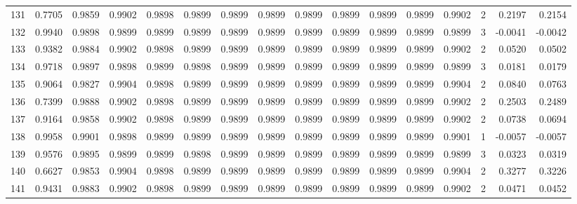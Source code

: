 \begin{tabular}{lrrrrrrrrrrrrrrr}
131 &      0.7705 &  0.9859 &  0.9902 &  0.9898 &  0.9899 &  0.9899 &  0.9899 &  0.9899 &  0.9899 &  0.9899 &   0.9899 &     0.9902 &      2 &                    0.2197 &                     0.2154 \\
132 &      0.9940 &  0.9898 &  0.9899 &  0.9899 &  0.9899 &  0.9899 &  0.9899 &  0.9899 &  0.9899 &  0.9899 &   0.9899 &     0.9899 &      3 &                   -0.0041 &                    -0.0042 \\
133 &      0.9382 &  0.9884 &  0.9902 &  0.9898 &  0.9899 &  0.9899 &  0.9899 &  0.9899 &  0.9899 &  0.9899 &   0.9899 &     0.9902 &      2 &                    0.0520 &                     0.0502 \\
134 &      0.9718 &  0.9897 &  0.9898 &  0.9899 &  0.9898 &  0.9899 &  0.9899 &  0.9899 &  0.9899 &  0.9899 &   0.9899 &     0.9899 &      3 &                    0.0181 &                     0.0179 \\
135 &      0.9064 &  0.9827 &  0.9904 &  0.9898 &  0.9899 &  0.9899 &  0.9899 &  0.9899 &  0.9899 &  0.9899 &   0.9899 &     0.9904 &      2 &                    0.0840 &                     0.0763 \\
136 &      0.7399 &  0.9888 &  0.9902 &  0.9898 &  0.9899 &  0.9899 &  0.9899 &  0.9899 &  0.9899 &  0.9899 &   0.9899 &     0.9902 &      2 &                    0.2503 &                     0.2489 \\
137 &      0.9164 &  0.9858 &  0.9902 &  0.9898 &  0.9899 &  0.9899 &  0.9899 &  0.9899 &  0.9899 &  0.9899 &   0.9899 &     0.9902 &      2 &                    0.0738 &                     0.0694 \\
138 &      0.9958 &  0.9901 &  0.9898 &  0.9899 &  0.9899 &  0.9899 &  0.9899 &  0.9899 &  0.9899 &  0.9899 &   0.9899 &     0.9901 &      1 &                   -0.0057 &                    -0.0057 \\
139 &      0.9576 &  0.9895 &  0.9899 &  0.9899 &  0.9898 &  0.9899 &  0.9899 &  0.9899 &  0.9899 &  0.9899 &   0.9899 &     0.9899 &      3 &                    0.0323 &                     0.0319 \\
140 &      0.6627 &  0.9853 &  0.9904 &  0.9898 &  0.9899 &  0.9899 &  0.9899 &  0.9899 &  0.9899 &  0.9899 &   0.9899 &     0.9904 &      2 &                    0.3277 &                     0.3226 \\
141 &      0.9431 &  0.9883 &  0.9902 &  0.9898 &  0.9899 &  0.9899 &  0.9899 &  0.9899 &  0.9899 &  0.9899 &   0.9899 &     0.9902 &      2 &                    0.0471 &                     0.0452 \\

\end{tabular}
